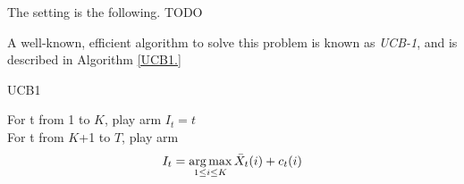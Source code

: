 The setting is the following. TODO

A well-known, efficient algorithm to solve this problem is known as \textit{UCB-1}, and is described in Algorithm \ref{UCB1.}

\begin{algorithm}
    \caption{UCB1}
    For t from 1 to $K$, play arm $I_t = t$ \\
    For t from $K$+1 to $T$, play arm 
    $$ I_t = \operatorname*{arg\,max}_{1\leq i \leq K} \bar X_t(i) + c_t(i)$$
\end{algorithm}
